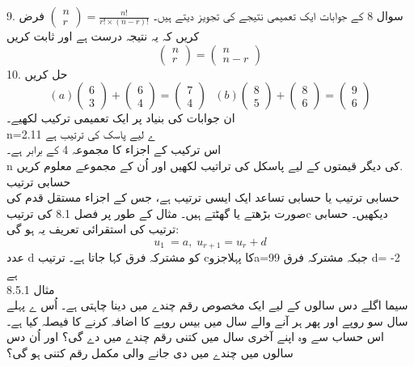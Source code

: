 9.	سوال 
8 کے جوابات ایک تعمیمی نتیجے کی تجویز دیتے ہیں۔
\(\begin{pmatrix}n \\ r\end{pmatrix} =\frac{n!}{r! \times (n  - r)!}\)
 فرض کریں کہ یہ نتیجہ درست ہے اور ثابت کریں\\
 \[\begin{pmatrix}n \\ r\end{pmatrix} = \begin{pmatrix}n \\ n - r\end{pmatrix}\]
10.	حل کریں\\
\[(a) \begin{pmatrix}6 \\ 3\end{pmatrix} + \begin{pmatrix}6 \\ 4\end{pmatrix} = \begin{pmatrix}7 \\ 4\end{pmatrix} \hspace{8pt} (b)\begin{pmatrix}8 \\ 5\end{pmatrix} + \begin{pmatrix}8 \\ 6\end{pmatrix} =\begin{pmatrix}9 \\ 6 \end{pmatrix}\]
ان جوابات کی بنیاد پر ایک تعمیمی ترکیب لکھیے۔\\
n=2.11
ے لیے پاسک کی ترتیب ہے\\
اس ترکیب کے اجزاء کا مجموعہ 4 کے برابر ہے۔\\
n
کی دیگر قیمتوں کے لیے پاسکل کی تراتیب لکھیں اور اُن کے مجموعے معلوم کریں.\\
حسابی ترتیب\\
حسابی ترتیب یا حسابی تساعد ایک ایسی ترتیب ہے، جس کے اجزاء مستقل قدم کی صورت بڑھتے یا گھٹتے ہیں۔ مثال کے طور پر فصل 8.1 کی ترتیبc دیکھیں۔ حسابی ترتیب کی استقرائی تعریف یہ ہو گی:\\
\[ u_{1} \ = a, \;  u_{r+1}  = u_{r} + d\]
عدد d کو مشترکہ فرق کہا جاتا ہے۔ ترتیب cکا پہلاجزوa=99 جبکہ مشترکہ فرق d= -2 ہے\\
مثال 
8.5.1\\
سیما اگلے دس سالوں کے لیے ایک مخصوص رقم چندے میں دینا چاہتی ہے۔ اُس ے پہلے سال سو روپے اور پھر ہر آنے والے سال میں بیس روپے کا اضافہ کرنے کا فیصلہ کیا ہے۔اس حساب سے وہ اپنے آخری سال میں کتنی رقم چندے میں دے گی؟ اور اُن دس سالوں میں چندے میں دی جانے والی مکمل رقم کتنی ہو گی؟\\
